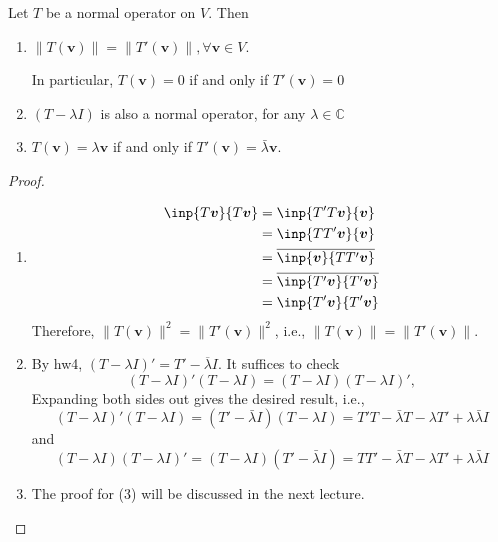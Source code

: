 \begin{proposition}
Let $T$ be a normal operator on $V$.
Then
\begin{enumerate}
\item
$\|T(\bm v)\| = \|T'(\bm v)\|,\forall\bm v\in V$.

In particular, $T(\bm v)=0$ if and only if $T'(\bm v)=0$
\item
$(T-\lambda I)$ is also a normal operator, for any $\lambda\in\mathbb{C}$
\item
$T(\bm v) = \lambda\bm v$ if and only if $T'(\bm v)=\bar{\lambda}\bm v$.
\end{enumerate}
\end{proposition}
\begin{proof}
\begin{enumerate}
\item
\begin{align*}
\inp{T\bm v}{T\bm v}&=\inp{T'T\bm v}{\bm v}\\
&=\inp{TT'\bm v}{\bm v}\\
&=\overline{\inp{\bm v}{TT'\bm v}}\\
&=\overline{\inp{T'\bm v}{T'\bm v}}\\
&=\inp{T'\bm v}{T'\bm v}
\end{align*}
Therefore, $\|T(\bm v)\|^2=\|T'(\bm v)\|^2$, i.e.,
$\|T(\bm v)\|=\|T'(\bm v)\|$.
\item
By hw4, $(T-\lambda I)' = T'-\overline{\lambda} I$.
It suffices to check
\[
(T-\lambda I)'(T-\lambda I)=(T-\lambda I)(T-\lambda I)',
\]
Expanding both sides out gives the desired result, i.e.,
\[
(T-\lambda I)'(T-\lambda I)
=(T'-\bar{\lambda}I)(T-\lambda I)
=T'T-\bar{\lambda}T-\lambda T'+\lambda\bar{\lambda}I
\]
and
\[
(T-\lambda I)(T-\lambda I)'
=
(T-\lambda I)(T'-\bar{\lambda}I)
=
TT'-\bar{\lambda}T-\lambda T'+\lambda\bar{\lambda}I
\]
\item
The proof for (3) will be discussed in the next lecture.
\end{enumerate}
\end{proof}




















